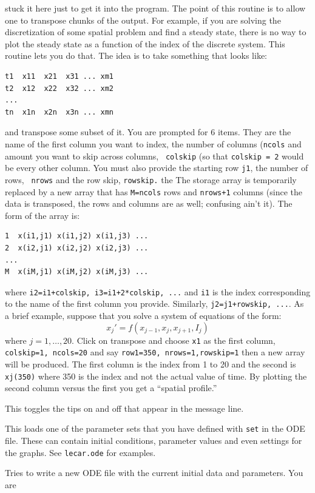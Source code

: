\documentclass{article}
\begin{document}
\begin{description}
\begin{description}
stuck it here just to get it into the program.  The point of this
routine is to allow one to transpose chunks of the output.  For
example, if you are solving the discretization of some spatial problem
and find a steady state, there is no way to plot the steady state as a
function of the index of the discrete system.  This routine lets you
do that.  The idea is to take something that looks like:
\begin{verbatim}
t1  x11  x21  x31 ... xm1 
t2  x12  x22  x32 ... xm2
...
tn  x1n  x2n  x3n ... xmn
\end{verbatim}
and transpose some subset of it. You are prompted for 6 items.  They
are the name of the first column you want to index, the number of
columns ({\tt ncols} and amount you want to skip across columns, {\tt
colskip} (so that {\tt colskip = 2} would be every other column.  You
must also provide the starting row {\tt j1}, the number of rows, {\tt
nrows} and the row skip, {\tt rowskip.} the The storage array is temporarily
replaced by a new array that has {\tt M=ncols} rows and {\tt nrows+1}
columns (since the data is transposed, the rows and columns are as
well; confusing ain't it).  The form of the array is:
\begin{verbatim}
1  x(i1,j1) x(i1,j2) x(i1,j3) ...
2  x(i2,j1) x(i2,j2) x(i2,j3) ...
...
M  x(iM,j1) x(iM,j2) x(iM,j3) ...
\end{verbatim}
where {\tt i2=i1+colskip, i3=i1+2*colskip, ...} and {\tt i1} is the
index corresponding to the name of the first column you
provide. Similarly, {\tt j2=j1+rowskip, ...}. As a brief example,
suppose that you solve a system of equations of the form:
\[
 x_j' = f(x_{j-1},x_j,x_{j+1},I_j)
\]
where $j=1,\dots,20.$ Click on transpose and choose {\tt x1} as the
first column, {\tt colskip=1, ncols=20} and say {\tt row1=350,
nrows=1,rowskip=1} then a new array will be produced. The first column
is the index from 1 to 20 and the second is {\tt xj(350)} where 350 is
the index and not the actual value of time. By plotting the second
column versus the first you get a ``spatial profile.'' 
\item[t(I)ps] This toggles the tips on and off that appear in the
message line.
\item[(G)et par set] This loads one of the parameter sets that you
have defined with {\tt set} in the ODE file.  These can contain initial conditions, parameter values and even
settings for the graphs.  See {\tt lecar.ode} for examples.
\item[c(L)one] Tries to write a new ODE file with the current initial data and parameters.  You are

\end{description}
\end{description}
\end{document}

